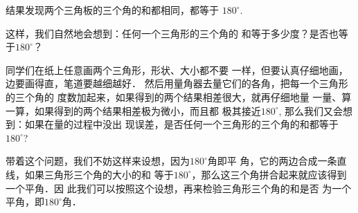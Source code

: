 结果发现两个三角板的三个角的和都相同，都等于
$180^{\circ}$.

\begin{figure}[htp]
	\centering
{}
	\caption{}
\end{figure}


这样，我们自然地会想到：任何一个三角形的三个角的
和等于多少度？是否也等于$180^{\circ}$？

同学们在纸上任意画两个三角形，形状、大小都不要
一样，但要认真仔细地画，边要画得直，笔道要越细越好．
然后用量角器去量它们的各角，把每一个三角形的三个角的
度数加起来，如果得到的两个结果相差很大，就再仔细地量
一量、算一算，如果得到的两个结果相差极为微小，而且都
极其接近$180^{\circ}$, 那么我们又会想到：如果在量的过程中没出
现误差，是否任何一个三角形的三个角的和都等于$180^{\circ}$?

带着这个问题，我们不妨这样来设想，因为$180^{\circ}$角即平
角，它的两边合成一条直线，如果三角形三个角的大小的和
等于$180^{\circ}$，那么这三个角拼合起来就应该得到一个平角．因
此我们可以按照这个设想，再来检验三角形三个角的和是否
为一个平角，即$180^{\circ}$角．

